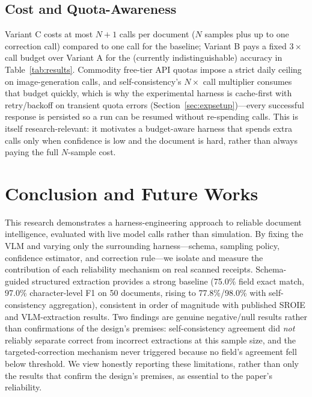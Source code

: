 \documentclass[conference]{IEEEtran}
\begin{document}
\subsection{Cost and Quota-Awareness}
Variant C costs at most \(N + 1\) calls per document (\(N\) samples plus up to one correction call) compared to one call for the baseline; Variant B pays a fixed \(3\times\) call budget over Variant A for the (currently indistinguishable) accuracy in Table~\ref{tab:results}. Commodity free-tier API quotas impose a strict daily ceiling on image-generation calls, and self-consistency's \(N\times\) call multiplier consumes that budget quickly, which is why the experimental harness is cache-first with retry/backoff on transient quota errors (Section~\ref{sec:expsetup})---every successful response is persisted so a run can be resumed without re-spending calls. This is itself research-relevant: it motivates a budget-aware harness that spends extra calls only when confidence is low and the document is hard, rather than always paying the full \(N\)-sample cost.

\section{Conclusion and Future Works}
\label{sec:conclusion}

This research demonstrates a harness-engineering approach to reliable document intelligence, evaluated with live model calls rather than simulation. By fixing the VLM and varying only the surrounding harness---schema, sampling policy, confidence estimator, and correction rule---we isolate and measure the contribution of each reliability mechanism on real scanned receipts. Schema-guided structured extraction provides a strong baseline (75.0\% field exact match, 97.0\% character-level F1 on 50 documents, rising to 77.8\%/98.0\% with self-consistency aggregation), consistent in order of magnitude with published SROIE and VLM-extraction results. Two findings are genuine negative/null results rather than confirmations of the design's premises: self-consistency agreement did \emph{not} reliably separate correct from incorrect extractions at this sample size, and the targeted-correction mechanism never triggered because no field's agreement fell below threshold. We view honestly reporting these limitations, rather than only the results that confirm the design's premises, as essential to the paper's reliability.
\end{document}
